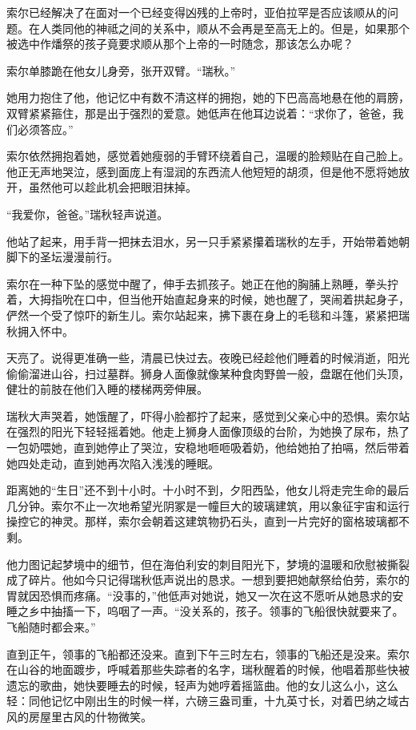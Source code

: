 \documentclass[AutoFakeBold=true]{book}
\begin{document}
索尔已经解决了在面对一个已经变得凶残的上帝时，亚伯拉罕是否应该顺从的问题。在人类同他的神祗之间的关系中，顺从不会再是至高无上的。但是，如果那个被选中作燔祭的{\kaishu 孩子}竟要求顺从那个上帝的一时随念，那该怎么办呢？

索尔单膝跪在他女儿身旁，张开双臂。``瑞秋。''

她用力抱住了他，他记忆中有数不清这样的拥抱，她的下巴高高地悬在他的肩膀，双臂紧紧箍住，那是出于强烈的爱意。她低声在他耳边说着：``求你了，爸爸，我们必须答应。''

索尔依然拥抱着她，感觉着她瘦弱的手臂环绕着自己，温暖的脸颊贴在自己脸上。他正无声地哭泣，感到面庞上有湿润的东西流人他短短的胡须，但是他不愿将她放开，虽然他可以趁此机会把眼泪抹掉。

``我爱你，爸爸。''瑞秋轻声说道。

他站了起来，用手背一把抹去泪水，另一只手紧紧攥着瑞秋的左手，开始带着她朝脚下的圣坛漫漫前行。

\vspace*{1em}

索尔在一种下坠的感觉中醒了，伸手去抓孩子。她正在他的胸脯上熟睡，拳头拧着，大拇指吮在口中，但当他开始直起身来的时候，她也醒了，哭闹着拱起身子，俨然一个受了惊吓的新生儿。索尔站起来，拂下裹在身上的毛毯和斗篷，紧紧把瑞秋拥入怀中。

天亮了。说得更准确一些，清晨已快过去。夜晚已经趁他们睡着的时候消逝，阳光偷偷溜进山谷，扫过墓群。狮身人面像就像某种食肉野兽一般，盘踞在他们头顶，健壮的前肢在他们入睡的楼梯两旁伸展。

瑞秋大声哭着，她饿醒了，吓得小脸都拧了起来，感觉到父亲心中的恐惧。索尔站在强烈的阳光下轻轻摇着她。他走上狮身人面像顶级的台阶，为她换了尿布，热了一包奶喂她，直到她停止了哭泣，安稳地咂咂吸着奶，他给她拍了拍嗝，然后带着她四处走动，直到她再次陷入浅浅的睡眠。

距离她的``生日''还不到十小时。十小时不到，夕阳西坠，他女儿将走完生命的最后几分钟。索尔不止一次地希望光阴冢是一幢巨大的玻璃建筑，用以象征宇宙和运行操控它的神灵。那样，索尔会朝着这建筑物扔石头，直到一片完好的窗格玻璃都不剩。

他力图记起梦境中的细节，但在海伯利安的刺目阳光下，梦境的温暖和欣慰被撕裂成了碎片。他如今只记得瑞秋低声说出的恳求。一想到要把她献祭给伯劳，索尔的胃就因恐惧而疼痛。``没事的，''他低声对她说，她又一次在这不愿听从她恳求的安睡之乡中抽搐一下，呜咽了一声。``没关系的，孩子。领事的飞船很快就要来了。飞船随时都会来。''

\vspace*{1em}

直到正午，领事的飞船都还没来。直到下午三时左右，领事的飞船还是没来。索尔在山谷的地面踱步，呼喊着那些失踪者的名字，瑞秋醒着的时候，他唱着那些快被遗忘的歌曲，她快要睡去的时候，轻声为她哼着摇篮曲。他的女儿这么小，这么轻：同他记忆中刚出生的时候一样，六磅三盎司重，十九英寸长，对着巴纳之域古风的房屋里古风的什物微笑。
\end{document}
